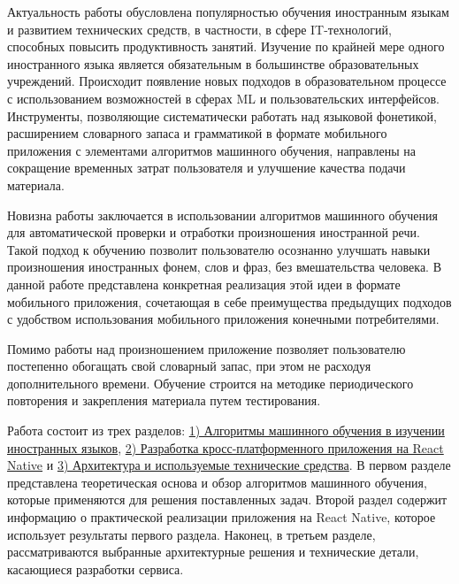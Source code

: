 Актуальность работы обусловлена популярностью обучения иностранным языкам и развитием технических средств, в частности, в сфере IT-технологий, способных повысить продуктивность занятий. Изучение по крайней мере одного иностранного языка является обязательным в большинстве образовательных учреждений. Происходит появление новых подходов в образовательном процессе с использованием возможностей в сферах ML и пользовательских интерфейсов. Инструменты, позволяющие систематически работать над языковой фонетикой, расширением словарного запаса и грамматикой в формате мобильного приложения с элементами алгоритмов машинного обучения, направлены на сокращение временных затрат пользователя и улучшение качества подачи материала.

Новизна работы заключается в использовании алгоритмов машинного обучения для автоматической проверки и отработки произношения иностранной речи. Такой подход к обучению позволит пользователю осознанно улучшать навыки произношения иностранных фонем, слов и фраз, без вмешательства человека. В данной работе представлена конкретная реализация этой идеи в формате мобильного приложения, сочетающая в себе преимущества предыдущих подходов с удобством использования мобильного приложения конечными потребителями.

Помимо работы над произношением приложение позволяет пользователю постепенно обогащать свой словарный запас, при этом не расходуя дополнительного времени. Обучение строится на методике периодического повторения и закрепления материала путем тестирования.

Работа состоит из трех разделов: \hyperref[sec:section-1]{1) Алгоритмы машинного обучения в изучении иностранных языков}, \hyperref[sec:section-2]{2) Разработка кросс-платформенного приложения на React Native} и \hyperref[sec:section-3]{3) Архитектура и используемые технические средства}. В первом разделе представлена теоретическая основа и обзор алгоритмов машинного обучения, которые применяются для решения поставленных задач. Второй раздел содержит информацию о практической реализации приложения на React Native, которое использует результаты первого раздела. Наконец, в третьем разделе, рассматриваются выбранные архитектурные решения и технические детали, касающиеся разработки сервиса.

